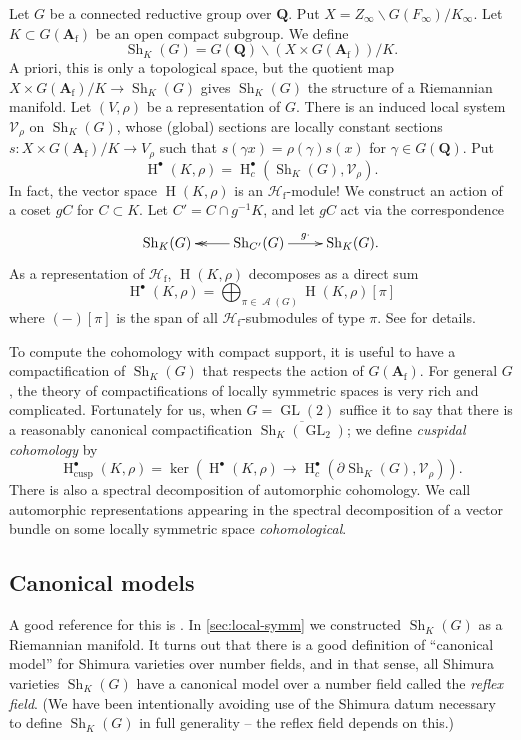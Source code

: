 \documentclass[11pt]{article}
\DeclareMathOperator{\automorphic}{\mathcal{A}}
\DeclareMathOperator{\GL}{GL}
\DeclareMathOperator{\h}{H}
\DeclareMathOperator{\shimura}{Sh}
\newcommand{\dA}{\mathbf{A}}
\newcommand{\dQ}{\mathbf{Q}}
\newcommand{\sV}{\mathscr{V}}
\newcommand{\cusp}{\mathrm{cusp}}
\newcommand{\finite}{\mathrm{f}}
\newcommand{\hecke}{\mathcal{H}}
\begin{document}
Let $G$ be a connected reductive group over $\dQ$. Put 
$X=Z_\infty \backslash G(F_\infty) / K_\infty$. Let 
$K\subset G(\dA_\finite)$ be an open compact subgroup. We define 
\[
  \shimura_K(G) = G(\dQ)\backslash (X\times G(\dA_\finite)) / K .
\]
A priori, this is only a topological space, but the quotient map 
$X\times G(\dA_\finite)/K \to \shimura_K(G)$ gives $\shimura_K(G)$ the 
structure of a Riemannian manifold. Let $(V,\rho)$ be a representation of $G$. 
There is an induced local system $\sV_\rho$ on $\shimura_K(G)$, whose (global) 
sections are locally constant sections $s:X\times G(\dA_\finite)/K \to V_\rho$ 
such that $s(\gamma x) = \rho(\gamma) s(x)$ for $\gamma\in G(\dQ)$. Put 
\[
  \h^\bullet(K,\rho) = \h_c^\bullet\left(\shimura_K(G),\sV_\rho\right) .
\]
In fact, the vector space $\h(K,\rho)$ is an $\hecke_\finite$-module! We 
construct an action of a coset $gC$ for $C\subset K$. Let 
$C'=C\cap g^{-1} K$, and let $g C$ act via the correspondence 
\[\xymatrix{
  \shimura_K(G) 
    & \ar@{->>}[l] \shimura_{C'}(G) \ar[r]^-{g\cdot} 
    & \shimura_K(G) .
}\]
As a representation of $\hecke_\finite$, $\h(K,\rho)$ decomposes as a direct 
sum 
\[
  \h^\bullet(K,\rho) = \bigoplus_{\pi\in \automorphic(G)} \h(K,\rho)[\pi]
\]
where $(-)[\pi]$ is the span of all $\hecke_\finite$-submodules of type $\pi$. 
See \cite{s09} for details. 

To compute the cohomology with compact support, it is useful to have a 
compactification of $\shimura_K(G)$ that respects the action of 
$G(\dA_\finite)$. For general $G$, the theory of compactifications of locally 
symmetric spaces is very rich and complicated. Fortunately for us, when 
$G=\GL(2)$ suffice it to say that there is a reasonably canonical 
compactification $\overline{\shimura_K(\GL_2)}$; we define \emph{cuspidal 
cohomology} by 
\[
  \h_\cusp^\bullet(K,\rho) = \ker\left(\h^\bullet(K,\rho) \to \h_c^\bullet(\partial \shimura_K(G),\sV_\rho)\right) .
\]
There is also a spectral decomposition of automorphic cohomology. We call
automorphic representations appearing in the spectral decomposition of a vector 
bundle on some locally symmetric space \emph{cohomological}. 


\subsection{Canonical models}\label{sec:can-model}

A good reference for this is \cite{m98}. In \autoref{sec:local-symm} we 
constructed $\shimura_K(G)$ as a Riemannian manifold. It turns out that there 
is a good definition of ``canonical model'' for Shimura varieties over number 
fields, and in that sense, all Shimura varieties $\shimura_K(G)$ have a 
canonical model over a number field called the \emph{reflex field}. (We have 
been intentionally avoiding use of the Shimura datum necessary to define 
$\shimura_K(G)$ in full generality -- the reflex field depends on this.) 
\end{document}
